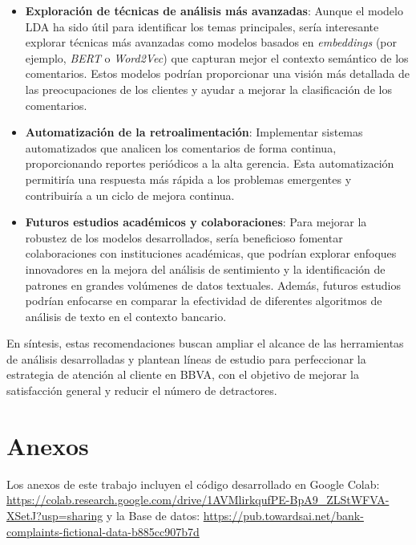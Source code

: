 \documentclass{matematicasud}
\begin{document}
\begin{itemize}
    \item \textbf{Exploración de técnicas de análisis más avanzadas}: Aunque el modelo LDA ha sido útil para identificar los temas principales, sería interesante explorar técnicas más avanzadas como modelos basados en \textit{embeddings} (por ejemplo, \textit{BERT} o \textit{Word2Vec}) que capturan mejor el contexto semántico de los comentarios. Estos modelos podrían proporcionar una visión más detallada de las preocupaciones de los clientes y ayudar a mejorar la clasificación de los comentarios.

    \item \textbf{Automatización de la retroalimentación}: Implementar sistemas automatizados que analicen los comentarios de forma continua, proporcionando reportes periódicos a la alta gerencia. Esta automatización permitiría una respuesta más rápida a los problemas emergentes y contribuiría a un ciclo de mejora continua.

    \item \textbf{Futuros estudios académicos y colaboraciones}: Para mejorar la robustez de los modelos desarrollados, sería beneficioso fomentar colaboraciones con instituciones académicas, que podrían explorar enfoques innovadores en la mejora del análisis de sentimiento y la identificación de patrones en grandes volúmenes de datos textuales. Además, futuros estudios podrían enfocarse en comparar la efectividad de diferentes algoritmos de análisis de texto en el contexto bancario.

\end{itemize}

En síntesis, estas recomendaciones buscan ampliar el alcance de las herramientas de análisis desarrolladas y plantean líneas de estudio para perfeccionar la estrategia de atención al cliente en BBVA, con el objetivo de mejorar la satisfacción general y reducir el número de detractores.

\section{Anexos}
Los anexos de este trabajo incluyen el código desarrollado en Google Colab: \url{https://colab.research.google.com/drive/1AVMlirkqufPE-BpA9_ZLStWFVA-XSetJ?usp=sharing} y la Base de datos: \url{https://pub.towardsai.net/bank-complaints-fictional-data-b885cc907b7d}
\end{document}
